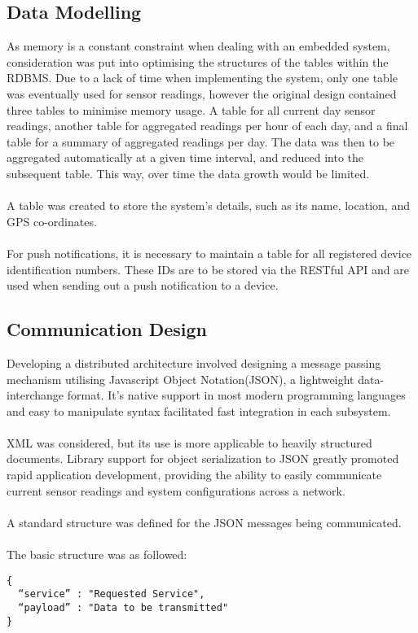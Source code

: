 \documentclass{article}
\begin{document}
\subsection{Data Modelling}
As memory is a constant constraint when dealing with an embedded system, consideration was put into optimising the structures of the tables within the RDBMS. Due to a lack of time when implementing the system, only one table was eventually used for sensor readings, however the original design contained three tables to minimise memory usage. A table for all current day sensor readings, another table for aggregated readings per hour of each day, and a final table for a summary of aggregated readings per day. The data was then to be aggregated automatically at a given time interval, and reduced into the subsequent table. This way, over time the data growth would be limited. \\\\
A table was created to store the system\rq s details, such as its name, location, and GPS co-ordinates. \\\\
For push notifications, it is necessary to maintain a table for all registered device identification numbers. These IDs are to be stored via the RESTful API and are used when sending out a push notification to a device. 
\subsection{Communication Design}
Developing a distributed architecture involved designing a message passing mechanism utilising Javascript Object Notation(JSON), a lightweight data-interchange format. It’s native support in most modern programming languages and easy to manipulate syntax facilitated fast integration in each subsystem. \\\\
XML was considered, but its use is more applicable to heavily structured documents.  Library support for object serialization to JSON greatly promoted rapid application development, providing the ability to easily communicate current sensor readings and system configurations across a network. \\\\ A standard structure was defined for the JSON messages being communicated. \\\\
\newpage
\noindent
The basic structure was as followed: 
\begin{lstlisting}[caption={JSON Message Structure},label={lst:json_message}]
{ 
  “service” : "Requested Service",
  “payload” : "Data to be transmitted"
}
\end{lstlisting}
\end{document}

